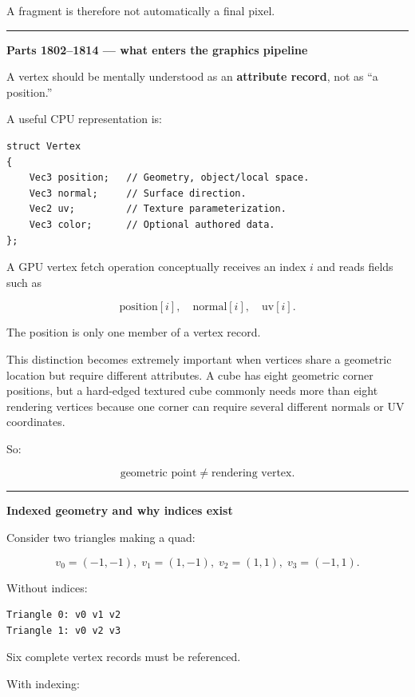 A fragment is therefore not automatically a final pixel.

\begin{center}\rule{0.5\linewidth}{0.5pt}\end{center}

\textbf{Parts 1802--1814 --- what enters the graphics pipeline}

A vertex should be mentally understood as an \textbf{attribute record}, not as ``a position.''

A useful CPU representation is:

\begin{verbatim}
struct Vertex
{
    Vec3 position;   // Geometry, object/local space.
    Vec3 normal;     // Surface direction.
    Vec2 uv;         // Texture parameterization.
    Vec3 color;      // Optional authored data.
};
\end{verbatim}

A GPU vertex fetch operation conceptually receives an index \(i\) and reads fields such as

\[
\text{position}[i],\quad
\text{normal}[i],\quad
\text{uv}[i].
\]

The position is only one member of a vertex record.

This distinction becomes extremely important when vertices share a geometric location but require different attributes. A cube has eight geometric corner positions, but a hard-edged textured cube commonly needs more than eight rendering vertices because one corner can require several different normals or UV coordinates.

So:

\[
\text{geometric point} \neq \text{rendering vertex}.
\]

\begin{center}\rule{0.5\linewidth}{0.5pt}\end{center}

\textbf{Indexed geometry and why indices exist}

Consider two triangles making a quad:

\[
v_0=(-1,-1),\;
v_1=(1,-1),\;
v_2=(1,1),\;
v_3=(-1,1).
\]

Without indices:

\begin{verbatim}
Triangle 0: v0 v1 v2
Triangle 1: v0 v2 v3
\end{verbatim}

Six complete vertex records must be referenced.

With indexing:

